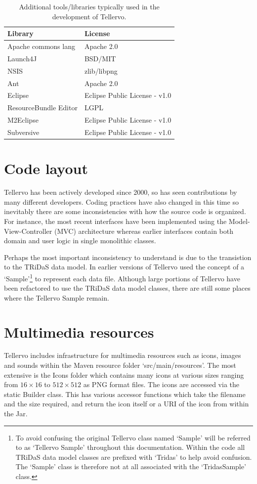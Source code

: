 \begin{table}[htbp]
\centering
\label{tbl:developDependencies}
\begin{tabular*}{0.6\textwidth}{ll}
\toprule
Library & License \\
\midrule
Apache commons lang & Apache 2.0 \\
Launch4J & BSD/MIT \\
NSIS & zlib/libpng \\
Ant & Apache 2.0 \\
Eclipse & Eclipse Public License - v1.0\\
ResourceBundle Editor & LGPL \\
M2Eclipse & Eclipse Public License - v1.0\\
Subversive & Eclipse Public License - v1.0\\
\bottomrule
\end{tabular*}
\captionsetup{width=0.6\textwidth}
\caption{Additional tools/libraries typically used in the development of Tellervo.}
\end{table}

\section{Code layout}
Tellervo has been actively developed since 2000, so has seen contributions by many different developers.  Coding practices have also changed in this time so inevitably there are some inconsistencies with how the source code is organized.  For instance, the most recent interfaces have been implemented using the Model-View-Controller (MVC) architecture whereas earlier interfaces contain both domain and user logic in single monolithic classes.  

Perhaps the most important inconsistency to understand is due to the transistion to the TRiDaS data model.  In earlier versions of Tellervo used the concept of a `Sample'\footnote{To avoid confusing the original Tellervo class named `Sample' will be referred to as `Tellervo Sample' throughout this documentation.  Within the code all TRiDaS data model classes are prefixed with `Tridas' to help avoid confusion.  The `Sample' class is therefore not at all associated with the `TridasSample' class.} to represent each data file.  Although large portions of Tellervo have been refactored to use the TRiDaS data model classes, there are still some places where the Tellervo Sample remain.  

\section{Multimedia resources}
Tellervo includes infrastructure for multimedia resources such as icons, images and sounds within the Maven resource folder `src/main/resources'.  The most extensive is the Icons folder which contains many icons at various sizes ranging from $16\times16$ to $512\times512$ as PNG format files.  The icons are accessed via the static Builder class.  This has various accessor functions which take the filename and the size required, and return the icon itself or a URI of the icon from within the Jar.

